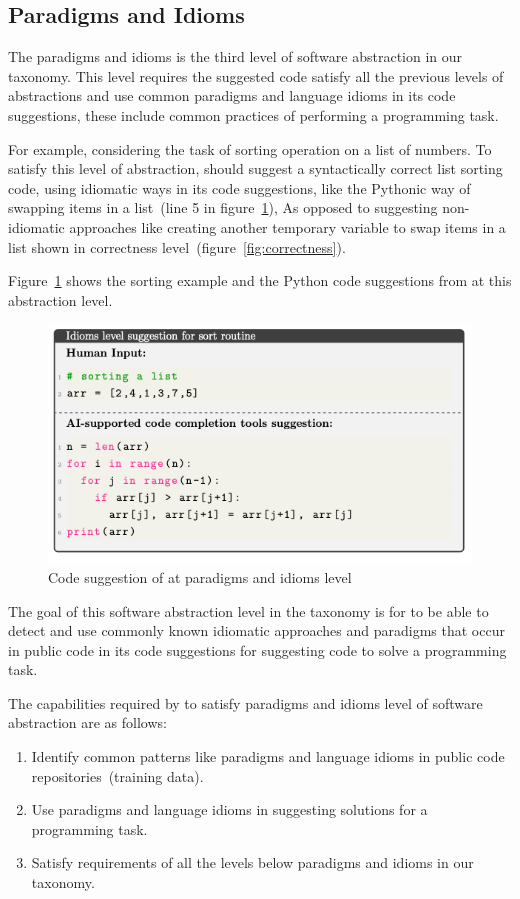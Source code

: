 \subsection{Paradigms and Idioms}
The paradigms and idioms is the third level of software abstraction in our taxonomy. 
This level requires the suggested code satisfy all the previous levels of abstractions and use common paradigms and language idioms in its code suggestions, these include common practices of performing a programming task. 

For example, considering the task of sorting operation on a list of numbers. 
To satisfy this level of abstraction, \cct{} should suggest a syntactically correct list sorting code, using idiomatic ways in its code suggestions, like the Pythonic way of swapping items in a list~(line 5 in figure~\ref{fig:idioms}), As opposed to suggesting non-idiomatic approaches like creating another temporary variable to swap items in a list shown in correctness level~(figure~\ref{fig:correctness}).

Figure~\ref{fig:idioms} shows the sorting example and the Python code suggestions from \cct{} at this abstraction level.

\begin{figure}[hbt!]
    \centering
    \includegraphics[width=\linewidth]{Figures/idioms.png}
    \caption{Code suggestion of \cct{} at paradigms and idioms level}
    \label{fig:idioms}
\end{figure}

The goal of this software abstraction level in the taxonomy is for \cct{} to be able to detect and use commonly known idiomatic approaches and paradigms that occur in public code in its code suggestions for suggesting code to solve a programming task.

The capabilities required by \cct{} to satisfy paradigms and idioms level of software abstraction are as follows:
\begin{enumerate}
    \item Identify common patterns like paradigms and language idioms in public code repositories~(training data).
    \item Use paradigms and language idioms in suggesting solutions for a programming task.
    \item Satisfy requirements of all the levels below paradigms and idioms in our taxonomy.
\end{enumerate}

